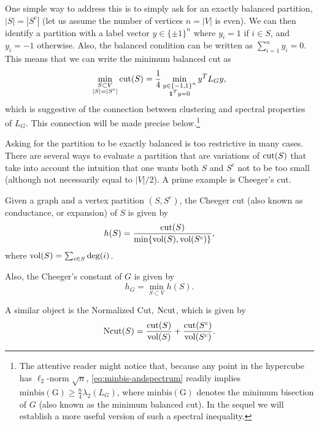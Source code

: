 \begin{remark}\label{remark:balancedLG}
One simple way to address this is to simply ask for an exactly balanced partition, $|S| = |S^c|$ (let us assume the number of vertices $n=|V|$ is even). We can then identify a partition with a label vector $y\in\{\pm 1\}^n$ where $y_i=1$ if $i\in S$, and $y_i=-1$ otherwise. Also, the balanced condition can be written as $\sum_{i=1}^n y_i = 0$. This means that we can write the minimum balanced cut as
\begin{equation}\label{eq:minbis-andspectrum}
\min_{\substack{S\subset V \\ |S|=|S^c|}}\cut(S) = %
\frac14 \min_{\substack{y\in\{-1,1\}^n \\ \1^Ty = 0}}  y^TL_Gy,
\end{equation}
which is suggestive of the connection between clustering and spectral properties of $L_G$. This connection will be made precise below.\footnote{The attentive reader might notice that, because any point in the hypercube has $\ell_2$-norm $\sqrt{n}$, \eqref{eq:minbis-andspectrum} readily implies $\mathrm{minbis(G)}\geq \frac{n}{4}\lambda_2(L_G)$, where $\mathrm{minbis(G)}$ denotes the minimum bisection of $G$ (also known as the minimum balanced cut). In the sequel we will establish a more useful version of such a spectral inequality.}
\end{remark}




Asking for the partition to be exactly balanced is too restrictive in many cases. There are several ways to evaluate a partition that are variations of $\operatorname{cut}(S)$ that take into account the intuition that one wants both $S$ and $S^c$ not to be too small (although not necessarily equal to $|V|/2$). A prime example is Cheeger's cut.

\begin{definition}
Given a graph and a vertex partition $(S,S^c)$, the Cheeger cut (also known as conductance, or expansion) of $S$ is given by
\[
h(S) = \frac{\operatorname{cut}(S)}{\min\{\operatorname{vol}(S), \operatorname{vol}(S^c) \}},
\]
where $\operatorname{vol}(S) = \sum_{i\in S}\deg(i)$.

Also, the Cheeger's constant of $G$ is given by
\[
h_G = \min_{S \subset V}  h(S).
\]
\end{definition}

A similar object is the Normalized Cut, $\operatorname{Ncut}$, which is given by
\[
\operatorname{Ncut}(S) = \frac{\operatorname{cut}(S)}{\operatorname{vol}(S)} + \frac{\operatorname{cut}(S^c)}{\operatorname{vol}(S^c)}.
\]

